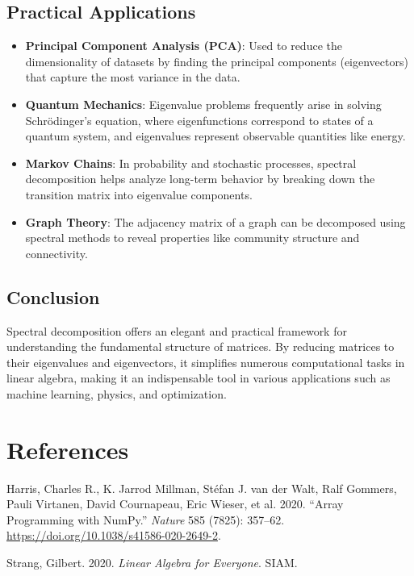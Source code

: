 \documentclass[
  letterpaper,
  DIV=11,
  numbers=noendperiod]{scrreprt}
\providecommand{\tightlist}{%
  \setlength{\itemsep}{0pt}\setlength{\parskip}{0pt}}\usepackage{longtable,booktabs,array}
\newlength{\cslhangindent}
\newenvironment{CSLReferences}[2] %
 {\begin{list}{}{%
  \setlength{\itemindent}{0pt}
  \setlength{\leftmargin}{0pt}
  \setlength{\parsep}{0pt}
  \ifodd #1
   \setlength{\leftmargin}{\cslhangindent}
   \setlength{\itemindent}{-1\cslhangindent}
  \fi
  \setlength{\itemsep}{#2\baselineskip}}}
 {\end{list}}
\theoremstyle{plain}
\theoremstyle{definition}
\theoremstyle{remark}
\begin{document}
\section{Practical Applications}\label{practical-applications}

\begin{itemize}
\tightlist
\item
  \textbf{Principal Component Analysis (PCA)}: Used to reduce the
  dimensionality of datasets by finding the principal components
  (eigenvectors) that capture the most variance in the data.
\item
  \textbf{Quantum Mechanics}: Eigenvalue problems frequently arise in
  solving Schrödinger's equation, where eigenfunctions correspond to
  states of a quantum system, and eigenvalues represent observable
  quantities like energy.
\item
  \textbf{Markov Chains}: In probability and stochastic processes,
  spectral decomposition helps analyze long-term behavior by breaking
  down the transition matrix into eigenvalue components.
\item
  \textbf{Graph Theory}: The adjacency matrix of a graph can be
  decomposed using spectral methods to reveal properties like community
  structure and connectivity.
\end{itemize}

\section{Conclusion}\label{conclusion}

Spectral decomposition offers an elegant and practical framework for
understanding the fundamental structure of matrices. By reducing
matrices to their eigenvalues and eigenvectors, it simplifies numerous
computational tasks in linear algebra, making it an indispensable tool
in various applications such as machine learning, physics, and
optimization.


\chapter*{References}\label{references}


\label{refs}
\begin{CSLReferences}{1}{0}
Harris, Charles R., K. Jarrod Millman, Stéfan J. van der Walt, Ralf
Gommers, Pauli Virtanen, David Cournapeau, Eric Wieser, et al. 2020.
{``Array Programming with {NumPy}.''} \emph{Nature} 585 (7825): 357--62.
\url{https://doi.org/10.1038/s41586-020-2649-2}.

Strang, Gilbert. 2020. \emph{Linear Algebra for Everyone}. SIAM.

\end{CSLReferences}
\end{document}
